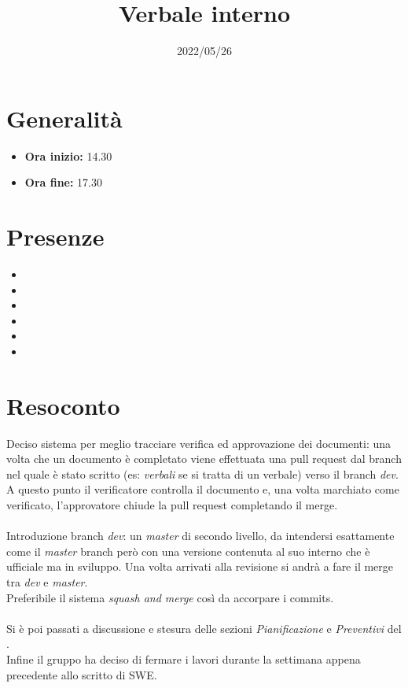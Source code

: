 \documentclass{classes/base}
\title{Verbale interno}
\date{2022/05/26}
\author{\marcob}
\renewcommand{\maketitle}{
    
}
\begin{document}
    \maketitle

    \section*{Generalità}
    \begin{itemize}
        \item \textbf{Ora inizio:} 14.30
        \item \textbf{Ora fine:} 17.30
    \end{itemize}

    \section*{Presenze}
    \begin{itemize}
        \item \tommaso
        \item \marcob
        \item \marcov
        \item \angela
        \item \giulio
        \item \matteo
    \end{itemize}

    \section*{Resoconto}
    Deciso sistema per meglio tracciare verifica ed approvazione dei documenti: una volta 
    che un documento è completato viene effettuata una pull request dal branch nel quale è stato
    scritto (es: \textit{verbali} se si tratta di un verbale) verso il branch \textit{dev}. \\
    A questo punto il verificatore controlla il documento e, una volta marchiato come verificato,
    l'approvatore chiude la pull request completando il merge.\\
    \\
    Introduzione branch \textit{dev}: un \textit{master} di secondo livello, da intendersi esattamente come il
    \textit{master} branch però con una versione contenuta al suo interno che è ufficiale ma in sviluppo.
    Una volta arrivati alla revisione si andrà a fare il merge tra \textit{dev} e \textit{master}.\\
    Preferibile il sistema \textit{squash and merge} così da accorpare i commits.\\
    \\
    Si è poi passati a discussione e stesura delle sezioni \textit{Pianificazione} e \textit{Preventivi}
    del \PdP.\\
    Infine il gruppo ha deciso di fermare i lavori durante la settimana appena precedente allo
    scritto di SWE.
\end{document}
